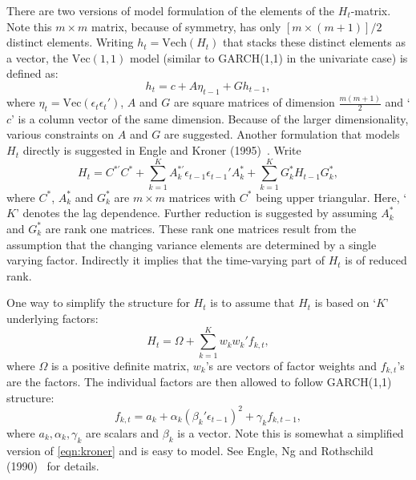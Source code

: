 There are two versions of model formulation of the elements of the $H_t$-matrix. Note this $m \times m$ matrix, because of symmetry, has only $[m \times (m+1)]/2$ distinct elements. Writing $h_t= \text{Vech}(H_t)$ that stacks these distinct elements as a vector, the $\text{Vec}(1,1)$ model (similar to GARCH(1,1) in the univariate case) is defined as:
	\begin{equation} \label{eqn:vecmodel}
	h_t= c + A \eta_{t-1} + G h_{t-1},
	\end{equation}
where $\eta_t= \text{Vec}(\epsilon_t\epsilon_t')$, $A$ and $G$ are square matrices of dimension $\frac{m(m+1)}{2}$ and `$c$' is a column vector of the same dimension. Because of the larger dimensionality, various constraints on $A$ and $G$ are suggested. Another formulation that models $H_t$ directly is suggested in Engle and Kroner (1995)~\cite{kroner}. Write
	\begin{equation} \label{eqn:kroner}
	H_t= C^{*'} C^* + \sum_{k=1}^K A_k^{*'} \epsilon_{t-1} \epsilon_{t-1}' A_k^* + \sum_{k=1}^K G_k^* H_{t-1}G_k^*,
	\end{equation}
where $C^*$, $A_k^*$ and $G_k^*$ are $m \times m$ matrices with $C^*$ being upper triangular. Here, `$K$' denotes the lag dependence. Further reduction is suggested by assuming $A_k^*$ and $G_k^*$ are rank one matrices. These rank one matrices result from the assumption that the changing variance elements are determined by a single varying factor. Indirectly it implies that the time-varying part of $H_t$ is of reduced rank. 


One way to simplify the structure for $H_t$ is to assume that $H_t$ is based on `$K$' underlying factors:
	\begin{equation} \label{eqn:factorH}
	H_t= \Omega + \sum_{k=1}^K w_k w_k' f_{k,t},
	\end{equation}
where $\Omega$ is a positive definite matrix, $w_k$'s are vectors of factor weights and $f_{k,t}$'s are the factors. The individual factors are then allowed to follow GARCH(1,1) structure:
	\begin{equation} \label{eqn:garchfactor}
	f_{k,t}= a_k + \alpha_k \left( \beta_k' \epsilon_{t-1} \right)^2 + \gamma_k f_{k,t-1},
	\end{equation}
where $a_k,\alpha_k,\gamma_k$ are scalars and $\beta_k$ is a vector. Note this is somewhat a simplified version of \eqref{eqn:kroner} and is easy to model. See Engle, Ng and Rothschild (1990)~\cite{engleng} for details. 


